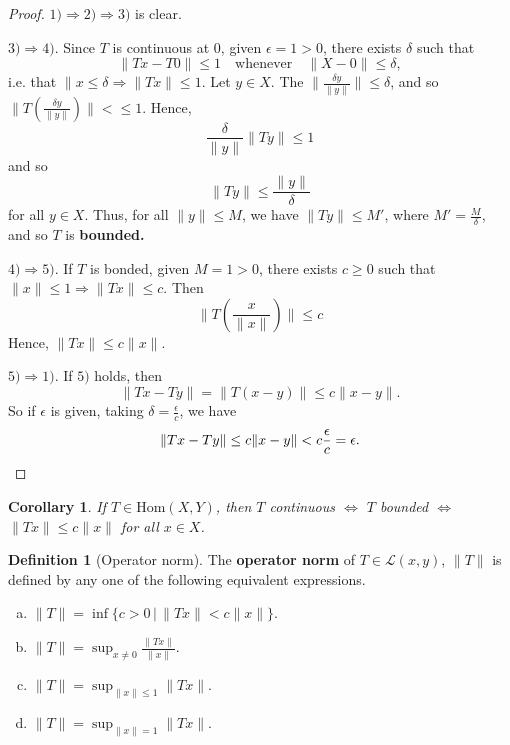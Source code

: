 \documentclass[10pt, oneside, reqno]{amsart}
\theoremstyle{plain}%
\newtheorem*{cor}{Corollary}
\theoremstyle{definition}
\newtheorem{defn}[thm]{Definition}
\theoremstyle{remark}
\begin{document}
\begin{proof}
    $1) \Rightarrow 2) \Rightarrow 3)$ is clear.
    
    $3) \Rightarrow 4)$.  Since $T$ is continuous at 0, given $\epsilon = 1 > 0$, there exists $\delta$ such that \[
        \| Tx - T0 \| \leq 1 \quad \text{whenever} \quad \| X - 0 \| \leq \delta,
    \] i.e. that $\| x \leq \delta \Rightarrow \| Tx \| \leq 1$.  Let $y \in X$.  The $\| \frac{\delta y}{\| y \|} \| \leq \delta$, and so $\| T\left( \frac{\delta y}{\| y \|} \right) \| < \leq 1$.  Hence, \[
        \frac{\delta}{\|y \|} \|T y \| \leq 1
    \] and so \[
        \|Ty \| \leq \frac{ \| y \|}{\delta}
    \] for all $y \in X$.  Thus, for all $\| y \| \leq M$, we have $\| Ty \| \leq M'$, where $M' = \frac{M}{\delta}$, and so $T$ is \textbf{bounded.} 
    
    $4) \Rightarrow 5)$.  If $T$ is bonded, given $M = 1 > 0$, there exists $c \geq 0$ such that $\| x \| \leq 1 \Rightarrow \|T x \| \leq c$.  Then \[
         \|T \left( \frac{x}{\|x \|} \right) \| \leq c  \] 
        Hence, $\|Tx \| \leq c \| x \|$.  
        
    $5) \Rightarrow 1)$.  If $5)$ holds, then  \[
        \| Tx - Ty \| = \| T(x-y) \| \leq c \| x - y \|.
    \]  So if $\epsilon$ is given, taking $\delta = \frac{\epsilon}{c}$, we have \[
        \|Tx - Ty \| \leq c \| x - y \| < c \frac{\epsilon}{c} = \epsilon. \qedhere
    \]
\end{proof}

\begin{cor}
    If $T \in \text{Hom}(X,Y)$, then $T$ continuous $\iff$ $T$ bounded $\iff$ $\|Tx \| \leq c \| x \|$ for all $x \in X$.
\end{cor}

\begin{defn}[Operator norm]
    The \textbf{operator norm} of $T \in \mathcal{L}(x,y)$, $\| T\|$ is defined by any one of the following equivalent expressions.
    \begin{enumerate}[(a)]
        \item $\|T \| = \inf \{ c > 0 \, | \, \| Tx \| < c \| x \| \}$.
        \item $\| T\| = \sup_{x \neq 0} \frac{ \|Tx \|}{\| x \|}$.
        \item $\| T \| = \sup_{ \|x \| \leq 1} \| Tx \|$.
        \item $\| T \| = \sup_{\| x \| = 1} \|T x \|$.
    \end{enumerate}
\end{defn}
\end{document}

